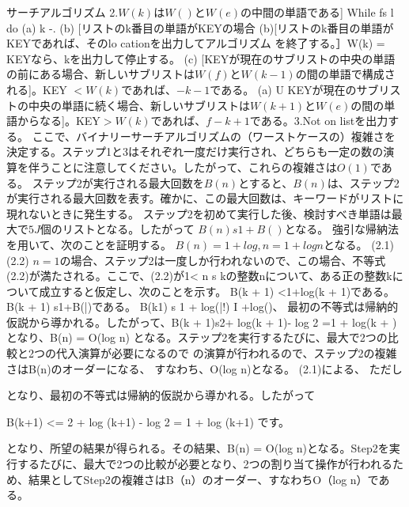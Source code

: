 
サーチアルゴリズム
2.$W(k)$は$W()$と$W(e)$の中間の単語である] While fs l do
(a) k -. (b) [リストのk番目の単語がKEYの場合
(b)[リストのk番目の単語がKEYであれば、そのlo cationを出力してアルゴリズム
を終了する。］W(k) = KEYなら、kを出力して停止する。
(c) [KEYが現在のサブリストの中央の単語の前にある場合、新しいサブリストは$W(f)$と$W(k -1)$の間の単語で構成される]。KEY $< W(k)$であれば、$-k-1$である。
(a) U KEYが現在のサブリストの中央の単語に続く場合、新しいサブリストは$W(k + 1)$と$W(e)$の間の単語からなる]。KEY$>W(k)$であれば、$f-k+1$である。3.Not on listを出力する。
ここで、バイナリーサーチアルゴリズムの（ワーストケースの）複雑さを決定する。ステップ1と3はそれぞれ一度だけ実行され、どちらも一定の数の演算を伴うことに注意してください。したがって、これらの複雑さは$O(1)$である。
ステップ2が実行される最大回数を$B(n)$とすると、$B(n)$は、ステップ2が実行される最大回数を表す。確かに、この最大回数は、キーワードがリストに現れないときに発生する。
ステップ2を初めて実行した後、検討すべき単語は最大で$5J$個のリストとなる。したがって
$B(n) s 1 + B()$となる。
強引な帰納法を用いて、次のことを証明する。
$B(n) = 1 + log, n = 1+log n $となる。
(2.1)
(2.2)
$n=1$の場合、ステップ2は一度しか行われないので、この場合、不等式(2.2)が満たされる。ここで、(2.2)が1< n s kの整数nについて、ある正の整数kについて成立すると仮定し、次のことを示す。
B(k + 1) <1+log(k + 1)である。
B(k + 1) s1+B(|)である。
B(k1) s 1 + log(|!) I +log()、
最初の不等式は帰納的仮説から導かれる。したがって、B(k + 1)s2+ log(k + 1)- log 2 =1 + log(k + )となり、B(n) = O(log n) となる。ステップ2を実行するたびに、最大で2つの比較と2つの代入演算が必要になるので
の演算が行われるので、ステップ2の複雑さはB(n)のオーダーになる、
すなわち、O(log n)となる。
(2.1)による、
ただし

となり、最初の不等式は帰納的仮説から導かれる。したがって

B(k+1) <= 2 + log (k+1) - log 2 = 1 + log (k+1) です。

となり、所望の結果が得られる。その結果、B(n) = O(log n)となる。Step2を実行するたびに、最大で2つの比較が必要となり、2つの割り当て操作が行われるため、結果としてStep2の複雑さはB（n）のオーダー、すなわちO（log n）である。